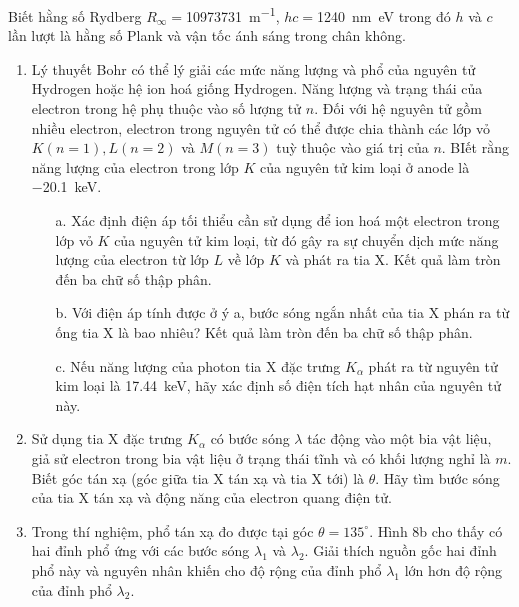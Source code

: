 \noindent Biết hằng số Rydberg $R_{\infty}=$\SI{10973731}{\metre^{-1}}, $hc=$\SI{1240}{\nano\metre\electronvolt} trong đó $h$ và $c$ lần lượt là hằng số Plank và vận tốc ánh sáng trong chân không.
\begin{enumerate}
  \item Lý thuyết Bohr có thể lý giải các mức năng lượng và phổ của nguyên tử Hydrogen hoặc hệ ion hoá giống Hydrogen. Năng lượng và trạng thái của electron trong hệ phụ thuộc vào số lượng tử $n$. Đối với hệ nguyên tử gồm nhiều electron, electron trong nguyên tử có thể được chia thành các lớp vỏ $K(n=1), L(n=2)$ và $M(n=3)$ tuỳ thuộc vào giá trị của $n$. BIết rằng năng lượng của electron trong lớp $K$ của nguyên tử kim loại ở anode là \SI{-20,1}{\kilo\electronvolt}.
        \begin{enumerate}
          \item[a.] Xác định điện áp tối thiểu cần sử dụng để ion hoá một electron trong lớp vỏ $K$ của nguyên tử kim loại, từ đó gây ra sự chuyển dịch mức năng lượng của electron từ lớp $L$ về lớp $K$ và phát ra tia X. Kết quả làm tròn đến ba chữ số thập phân.
          \item[b.] Với điện áp tính được ở ý a, bước sóng ngắn nhất của tia X phán ra từ ống tia X là bao nhiêu? Kết quả làm tròn đến ba chữ số thập phân.
          \item[c.] Nếu năng lượng của photon tia X đặc trưng $K_{\alpha}$ phát ra từ nguyên tử kim loại là \SI{17,44}{\kilo\electronvolt}, hãy xác định số điện tích hạt nhân của nguyên tử này.
        \end{enumerate}
  \item Sử dụng tia X đặc trưng $K_{\alpha}$ có bước sóng $\lambda$ tác động vào một bia vật liệu, giả sử electron trong bia vật liệu ở trạng thái tĩnh và có khối lượng nghỉ là $m$. Biết góc tán xạ (góc giữa tia X tán xạ và tia X tới) là $\theta$. Hãy tìm bước sóng của tia X tán xạ và động năng của electron quang điện tử.
  \item Trong thí nghiệm, phổ tán xạ đo được tại góc $\theta=135^{\circ}$. Hình 8b cho thấy có hai đỉnh phổ ứng với các bước sóng $\lambda_{1}$ và $\lambda_{2}$. Giải thích nguồn gốc hai đỉnh phổ này và nguyên nhân khiến cho độ rộng của đỉnh phổ $\lambda_{1}$ lớn hơn độ rộng của đỉnh phổ $\lambda_{2}$.
\end{enumerate}